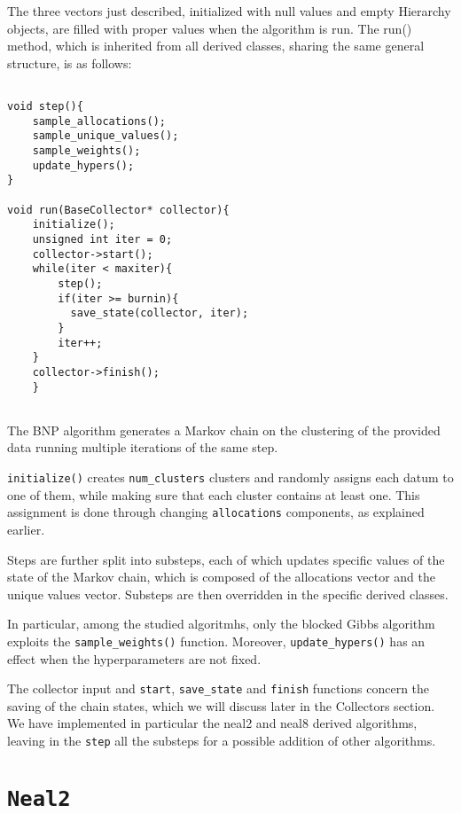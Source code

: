 The three vectors just described, initialized with null values and empty Hierarchy objects, are filled with proper values when the algorithm is run.
The run() method, which is inherited from all derived classes, sharing the same general structure, is as follows:

\begin{verbatim}

void step(){
    sample_allocations();
    sample_unique_values();
    sample_weights();
    update_hypers();
}

void run(BaseCollector* collector){
    initialize();
    unsigned int iter = 0;
    collector->start();
    while(iter < maxiter){
        step();
        if(iter >= burnin){
          save_state(collector, iter);
        }
        iter++;
    }
    collector->finish();
    }
    
\end{verbatim}

The BNP algorithm generates a Markov chain on the clustering of the provided data running multiple iterations of the same step.

\verb|initialize()| creates \verb|num_clusters| clusters and randomly assigns each datum to one of them, while making sure that each cluster contains at least one.
	This assignment is done through changing \verb|allocations| components, as explained earlier.

Steps are further split into substeps, each of which updates specific values of the state of the Markov chain, which is composed of the allocations vector and the unique values vector. Substeps are then overridden in the specific derived classes.

In particular, among the studied algoritmhs, only the blocked Gibbs algorithm exploits the \verb|sample_weights()| function. Moreover, \verb|update_hypers()| has an effect  when the hyperparameters are not fixed.

The collector input and \verb|start|, \verb|save_state| and \verb|finish| functions concern the saving of the chain states, which we will discuss later in the Collectors section.
We have implemented in particular the neal2 and neal8 derived algorithms, leaving in the \verb|step| all the substeps for a possible addition of other algorithms.




\section{\texttt{Neal2}}


